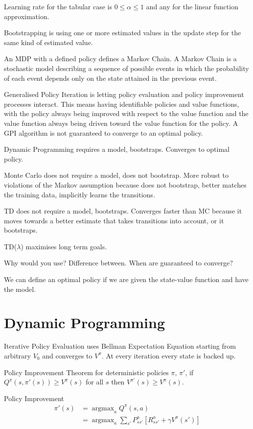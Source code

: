 \documentclass[twocolumn]{article}
\DeclareMathOperator*{\argmax}{argmax}
\begin{document}
Learning rate for the tabular case is $0\le\alpha\le1$ and any for the linear function approximation.

Bootstrapping is using one or more estimated values in the update step for the same kind of estimated value.

An MDP with a defined policy defines a Markov Chain. A Markov Chain is a stochastic model describing a sequence of possible events in which the probability of each event depends only on the state attained in the previous event.

Generalised Policy Iteration is letting policy evaluation and policy improvement processes interact. This means having identifiable policies and value functions, with the policy always being improved with respect to the value function and the value function always being driven toward the value function for the policy. A GPI algorithm is not guaranteed to converge to an optimal policy.

Dynamic Programming requires a model, bootstraps. Converges to optimal policy.

Monte Carlo does not require a model, does not bootstrap. More robust to violations of the Markov assumption because does not bootstrap, better matches the training data, implicitly learns the transitions.

TD does not require a model, bootstraps. Converges faster than MC because it moves towards a better estimate that takes transitions into account, or it bootstraps.

TD($\lambda$) maximises long term goals.

Why would you use? Difference between. When are guaranteed to converge?

We can define an optimal policy if we are given the state-value function and have the model.

\section{Dynamic Programming}

Iterative Policy Evaluation uses Bellman Expectation Equation starting from arbitrary $V_0$ and converges to $V^\pi$. At every iteration every state is backed up.

Policy Improvement Theorem for deterministic policies $\pi$, $\pi'$, if $Q^\pi(s,\pi'(s))\ge V^\pi(s)$ for all $s$ then $V^{\pi'}(s)\ge V^\pi(s)$.

Policy Improvement
\begin{align*}
\pi'(s)&=\argmax_a Q^\pi(s,a) \\
&=\argmax_a\sum_{s'}P^a_{ss'}[R^a_{ss'}+\gamma V^\pi(s')]
\end{align*}
\end{document}
